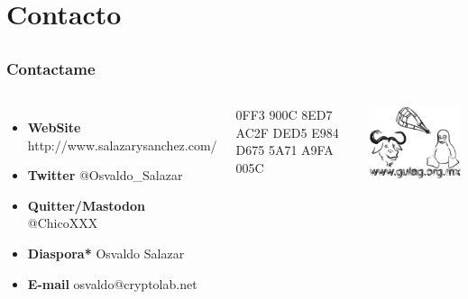 %
%

\section{Contacto}

\subsection{}
\begin{frame}
    \frametitle{Contactame}
    \begin{columns}
            \begin{itemize}
                \item \textbf{WebSite} http://www.salazarysanchez.com/
                \indent\par
                \item \textbf{Twitter} @Osvaldo\_Salazar
                \indent\par
                \item \textbf{Quitter/Mastodon} @ChicoXXX
                \indent\par
                \item \textbf{Diaspora*} Osvaldo Salazar
                \indent\par
                \item \textbf{E-mail} osvaldo@cryptolab.net
            \end{itemize}
            0FF3 900C 8ED7 AC2F DED5 E984 D675 5A71 A9FA 005C\par
            \includegraphics[width=\textwidth]{LogotipoGULAG.jpg}
    \end{columns}
\end{frame}

